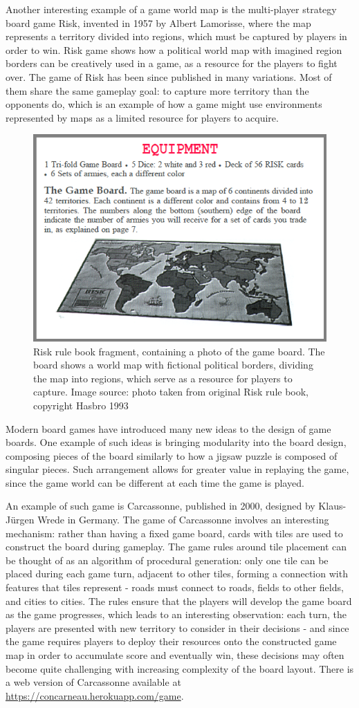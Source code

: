 \documentclass[12pt]{report}
\begin{document}
Another interesting example of a game world map is the multi-player strategy board game Risk, invented in 1957 by Albert Lamorisse, where the map represents a territory divided into regions, which must be captured by players in order to win. Risk game shows how a political world map with imagined region borders can be creatively used in a game, as a resource for the players to fight over. The game of Risk has been since published in many variations. Most of them share the same gameplay goal: to capture more territory than the opponents do, which is an example of how a game might use environments represented by maps as a limited resource for players to acquire.
 
\begin{figure}[H]
	\centering
	\includegraphics[width=0.5\linewidth]{images/risk-rulebook} 
	\caption{Risk rule book fragment, containing a photo of the game board. The board shows a world map with fictional political borders, dividing the map into regions, which serve as a resource for players to capture. Image source: photo taken from original Risk rule book, copyright Hasbro 1993}
	\label{fig:acrord32risk1}
\end{figure}

Modern board games have introduced many new ideas to the design of game boards. One example of such ideas is bringing modularity into the board design, composing pieces of the board similarly to how a jigsaw puzzle is composed of singular pieces. Such arrangement allows for greater value in replaying the game, since the game world can be different at each time the game is played. 

An example of such game is Carcassonne, published in 2000, designed by Klaus-Jürgen Wrede in Germany. The game of Carcassonne involves an interesting mechanism: rather than having a fixed game board, cards with tiles are used to construct the board during gameplay. The game rules around tile placement can be thought of as an algorithm of procedural generation: only one tile can be placed during each game turn, adjacent to other tiles, forming a connection with features that tiles represent - roads must connect to roads, fields to other fields, and cities to cities. The rules ensure that the players will develop the game board as the game progresses, which leads to an interesting observation: each turn, the players are presented with new territory to consider in their decisions - and since the game requires players to deploy their resources onto the constructed game map in order to accumulate score and eventually win, these decisions may often become quite challenging with increasing complexity of the board layout. There is a web version of Carcassonne available at \url{https://concarneau.herokuapp.com/game}.
\end{document}
